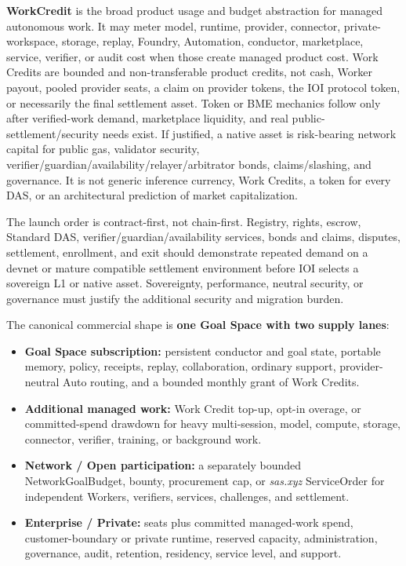 \documentclass[
  11pt,
]{article}
\providecommand{\tightlist}{%
  \setlength{\itemsep}{0pt}\setlength{\parskip}{0pt}}
\begin{document}
\textbf{WorkCredit} is the broad product usage and budget abstraction for
managed autonomous work. It may meter model, runtime, provider, connector,
private-workspace, storage, replay, Foundry, Automation, conductor,
marketplace, service, verifier, or audit cost when those create managed
product cost. Work Credits are bounded and non-transferable product
credits, not cash, Worker payout, pooled provider seats, a claim on
provider tokens, the IOI protocol token, or necessarily the final
settlement asset. Token or BME mechanics follow only after verified-work
demand, marketplace liquidity, and real public-settlement/security needs exist.
If justified, a native asset is risk-bearing network capital for public gas,
validator security, verifier/guardian/availability/relayer/arbitrator bonds,
claims/slashing, and governance. It is not generic inference currency, Work
Credits, a token for every DAS, or an architectural prediction of market
capitalization.

The launch order is contract-first, not chain-first. Registry, rights, escrow,
Standard DAS, verifier/guardian/availability services, bonds and claims,
disputes, settlement, enrollment, and exit should demonstrate repeated demand
on a devnet or mature compatible settlement environment before IOI selects a
sovereign L1 or native asset. Sovereignty, performance, neutral security, or
governance must justify the additional security and migration burden.

The canonical commercial shape is \textbf{one Goal Space with two
supply lanes}:

\begin{itemize}
\tightlist
\item
  \textbf{Goal Space subscription:} persistent conductor and goal state,
  portable memory, policy, receipts, replay, collaboration, ordinary
  support, provider-neutral Auto routing, and a bounded monthly grant of
  Work Credits.
\item
  \textbf{Additional managed work:} Work Credit top-up, opt-in overage,
  or committed-spend drawdown for heavy multi-session, model, compute,
  storage, connector, verifier, training, or background work.
\item
  \textbf{Network / Open participation:} a separately bounded
  NetworkGoalBudget, bounty, procurement cap, or \emph{sas.xyz}
  ServiceOrder for independent Workers, verifiers, services, challenges,
  and settlement.
\item
  \textbf{Enterprise / Private:} seats plus committed managed-work spend,
  customer-boundary or private runtime, reserved capacity,
  administration, governance, audit, retention, residency, service level,
  and support.
\end{itemize}
\end{document}
